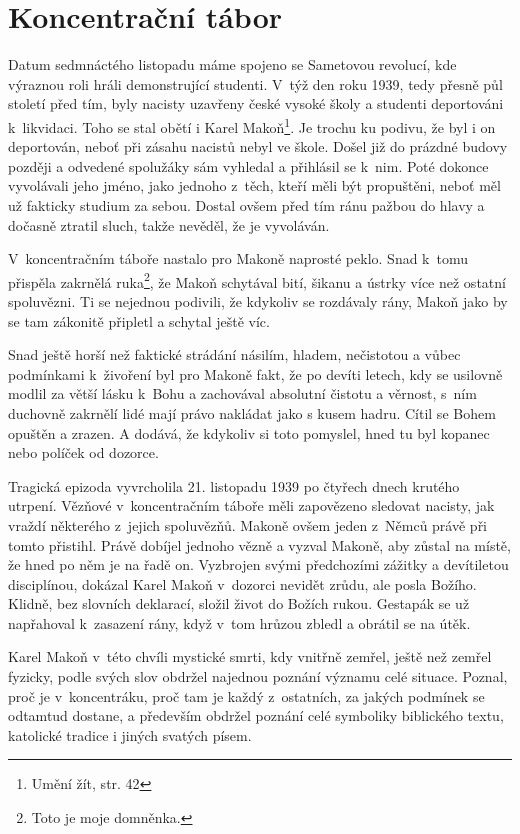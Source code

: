 \section{Koncentrační tábor}

Datum sedmnáctého listopadu máme spojeno se Sametovou revolucí, kde výraznou
roli hráli demonstrující studenti. V~týž den roku 1939, tedy
přesně půl století před tím, byly nacisty uzavřeny české vysoké školy a studenti
deportováni k~likvidaci. Toho se stal obětí i Karel Makoň\footnote{Umění žít,
str. 42}. Je trochu ku podivu,
že byl i on deportován, neboť při zásahu nacistů nebyl ve škole. Došel již do
prázdné budovy později a odvedené spolužáky sám vyhledal a přihlásil se k~nim.
Poté dokonce vyvolávali jeho jméno, jako jednoho z~těch, kteří měli být
propuštěni, neboť měl už fakticky studium za sebou. Dostal ovšem před tím ránu
pažbou do hlavy a dočasně ztratil sluch, takže nevěděl, že je
vyvoláván.

V~koncentračním táboře nastalo pro Makoně naprosté peklo. Snad k~tomu přispěla
zakrnělá ruka\footnote{Toto je moje domněnka.}, že Makoň schytával bití,
šikanu a ústrky více než ostatní spoluvězni. Ti se nejednou podivili, že
kdykoliv se rozdávaly rány, Makoň jako by se tam zákonitě připletl a schytal
ještě víc.

Snad ještě horší než faktické strádání násilím, hladem, nečistotou a vůbec
podmínkami k~živoření byl pro Makoně fakt, že po devíti letech,
kdy se usilovně modlil za větší lásku k~Bohu a zachovával absolutní čistotu a
věrnost, s~ním duchovně zakrnělí lidé mají právo nakládat jako s kusem hadru.
Cítil se Bohem opuštěn a zrazen. A dodává, že kdykoliv si toto pomyslel, hned tu
byl kopanec nebo políček od dozorce.

Tragická epizoda vyvrcholila 21. listopadu 1939 po čtyřech dnech krutého utrpení. Vězňové
v~koncentračním táboře měli zapovězeno sledovat nacisty, jak vraždí některého
z~jejich spoluvězňů. Makoně ovšem jeden z~Němců právě při tomto přistihl. Právě
dobíjel jednoho vězně a vyzval Makoně, aby zůstal na místě, že hned po něm je na
řadě on. Vyzbrojen svými předchozími zážitky a devítiletou disciplínou, dokázal
Karel Makoň v~dozorci nevidět zrůdu, ale posla Božího. Klidně, bez slovních deklarací,
složil život do Božích rukou. Gestapák se už napřahoval k~zasazení rány, když
v~tom hrůzou zbledl a obrátil se na útěk.

Karel Makoň v~této chvíli mystické smrti, kdy vnitřně zemřel, ještě než zemřel
fyzicky, podle svých slov obdržel najednou poznání významu celé situace. Poznal,
proč je v~koncentráku, proč tam je každý z~ostatních, za jakých podmínek se
odtamtud dostane, a především obdržel poznání celé symboliky biblického textu,
katolické tradice i jiných svatých písem.

